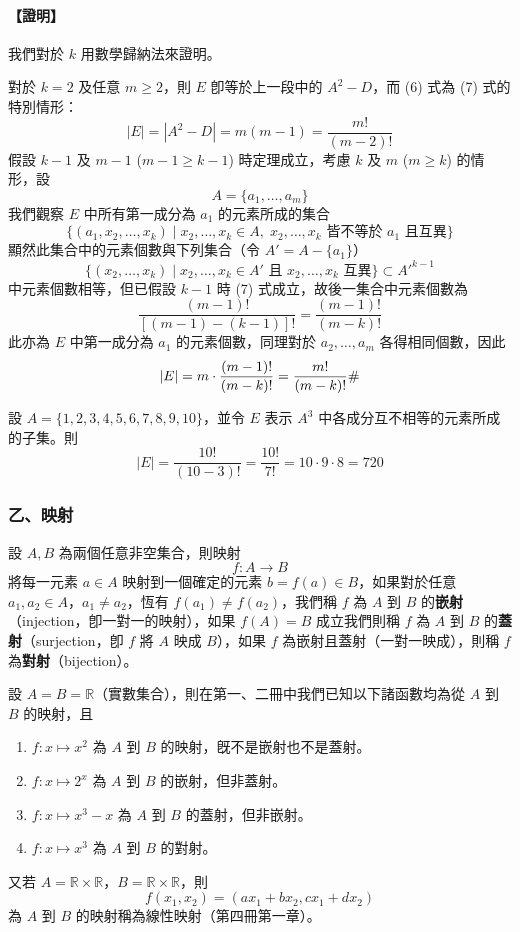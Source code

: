 \paragraph{【證明】}
我們對於 $k$ 用數學歸納法來證明。

對於 $k = 2$ 及任意 $m \ge 2$，則 $E$ 卽等於上一段中的 $A^2 - D$，而 (6) 式為 (7) 式的特別情形：
\[
|E| = |A^2 - D| = m(m-1) = \frac{m!}{(m-2)!}
\]
假設 $k-1$ 及 $m-1$ ($m-1 \ge k-1$) 時定理成立，考慮 $k$ 及 $m$ ($m \ge k$) 的情形，設
\[
A = \{a_1, \ldots, a_m\}
\]
我們觀察 $E$ 中所有第一成分為 $a_1$ 的元素所成的集合
\[
\{(a_1, x_2, \ldots, x_k) \mid x_2, \ldots, x_k \in A,\; x_2, \ldots, x_k \text{ 皆不等於 } a_1 \text{ 且互異}\}
\]
顯然此集合中的元素個數與下列集合（令 $A' = A - \{a_1\}$）
\[
\{(x_2, \ldots, x_k) \mid x_2, \ldots, x_k \in A' \text{ 且 } x_2, \ldots, x_k \text{ 互異}\} \subset A'^{k-1}
\]
中元素個數相等，但已假設 $k-1$ 時 (7) 式成立，故後一集合中元素個數為
\[
\frac{(m-1)!}{[(m-1)-(k-1)]!} = \frac{(m-1)!}{(m-k)!}
\]
此亦為 $E$ 中第一成分為 $a_1$ 的元素個數，同理對於 $a_2, \ldots, a_m$ 各得相同個數，因此
\[
|E| = m \cdot \frac{(m-1)!}{(m-k)!} = \frac{m!}{(m-k)!} \hfill \#
\]

\medskip
\begin{example}\label{ex:b5s-2-3}
設 $A=\{1,2,3,4,5,6,7,8,9,10\}$，並令 $E$ 表示 $A^3$ 中各成分互不相等的元素所成的子集。則
\[
|E| = \frac{10!}{(10-3)!} = \frac{10!}{7!} = 10 \cdot 9 \cdot 8 = 720
\]
\end{example}

\subsubsection*{乙、映射}

設 $A, B$ 為兩個任意非空集合，則映射
\[
f : A \longrightarrow B
\]
將每一元素 $a \in A$ 映射到一個確定的元素 $b = f(a) \in B$，如果對於任意 $a_1, a_2 \in A$，$a_1 \ne a_2$，恆有 $f(a_1) \ne f(a_2)$，我們稱 $f$ 為 $A$ 到 $B$ 的\textbf{嵌射}（injection，卽一對一的映射），如果 $f(A) = B$ 成立我們則稱 $f$ 為 $A$ 到 $B$ 的\textbf{蓋射}（surjection，卽 $f$ 將 $A$ 映成 $B$），如果 $f$ 為嵌射且蓋射（一對一映成），則稱 $f$ 為\textbf{對射}（bijection）。

設 $A = B = \mathbb{R}$（實數集合），則在第一、二冊中我們已知以下諸函數均為從 $A$ 到 $B$ 的映射，且
\begin{enumerate}[label=(\roman*), topsep=2pt, itemsep=2pt]
  \item $f : x \longmapsto x^2$ 為 $A$ 到 $B$ 的映射，旣不是嵌射也不是蓋射。
  \item $f : x \longmapsto 2^x$ 為 $A$ 到 $B$ 的嵌射，但非蓋射。
  \item $f : x \longmapsto x^3 - x$ 為 $A$ 到 $B$ 的蓋射，但非嵌射。
  \item $f : x \longmapsto x^3$ 為 $A$ 到 $B$ 的對射。
\end{enumerate}
又若 $A = \mathbb{R} \times \mathbb{R}$，\quad $B = \mathbb{R} \times \mathbb{R}$，則
\[
f(x_1, x_2) = (a x_1 + b x_2, c x_1 + d x_2)
\]
為 $A$ 到 $B$ 的映射稱為線性映射（第四冊第一章）。

